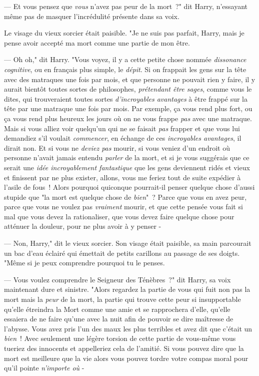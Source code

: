 --- Et vous pensez que \emph{vous} n'avez pas peur de la mort~?" dit Harry, n'essayant même pas de masquer l'incrédulité présente dans sa voix.

Le visage du vieux sorcier était paisible. "Je ne suis pas parfait, Harry, mais je pense avoir accepté ma mort comme une partie de mon être.

--- Oh oh," dit Harry. "Vous voyez, il y a cette petite chose nommée \emph{dissonance cognitive}, ou en français plus simple, le \emph{dépit}. Si on frappait les gens sur la tête avec des matraques une fois par mois, et que personne ne pouvait rien y faire, il y aurait bientôt toutes sortes de philosophes, \emph{prétendant être sages}, comme vous le dites, qui trouveraient toutes sortes \emph{d'incroyables avantages} à être frappé sur la tête par une matraque une fois par mois. Par exemple, ça vous rend plus fort, ou ça vous rend plus heureux les jours où on ne vous frappe \emph{pas} avec une matraque. Mais si vous alliez voir quelqu'un qui ne se faisait \emph{pas} frapper et que vous lui demandiez s'il voulait \emph{commencer}, en échange de ces \emph{incroyables avantages}, il dirait non. Et si vous ne \emph{deviez pas} mourir, si vous veniez d'un endroit où personne n'avait jamais entendu \emph{parler} de la mort, et si je vous suggérais que ce serait une \emph{idée incroyablement fantastique} que les gens deviennent ridés et vieux et finissent par ne plus exister, allons, vous me feriez tout de suite expédier à l'asile de fous~! Alors pourquoi quiconque pourrait-il penser quelque chose d'aussi stupide que "la mort est quelque chose de \emph{bien}"~? Parce que vous en avez peur, parce que vous ne voulez pas \emph{vraiment} mourir, et que cette pensée vous fait si mal que vous devez la rationaliser, que vous devez faire quelque chose pour atténuer la douleur, pour ne plus avoir à y penser -

--- Non, Harry," dit le vieux sorcier. Son visage était paisible, sa main parcourait un bac d'eau éclairé qui émettait de petits carillons au passage de ses doigts. "Même si je peux comprendre pourquoi tu le penses.

--- Vous voulez comprendre le Seigneur des Ténèbres~?" dit Harry, sa voix maintenant dure et sinistre. "Alors regardez la partie de vous qui fuit non pas la mort mais la \emph{peur} de la mort, la partie qui trouve cette peur si insupportable qu'elle étreindra la Mort comme une amie et se rapprochera d'elle, qu'elle essaiera de ne faire qu'une avec la nuit afin de pouvoir se dire maîtresse de l'abysse. Vous avez pris l'un des maux les plus terribles et avez dit que c'était un \emph{bien}~! Avec seulement une légère torsion de cette partie de vous-même vous tueriez des innocents et appelleriez cela de l'amitié. Si vous pouvez dire que la mort est meilleure que la vie alors vous pouvez tordre votre compas moral pour qu'il pointe \emph{n'importe où} -

